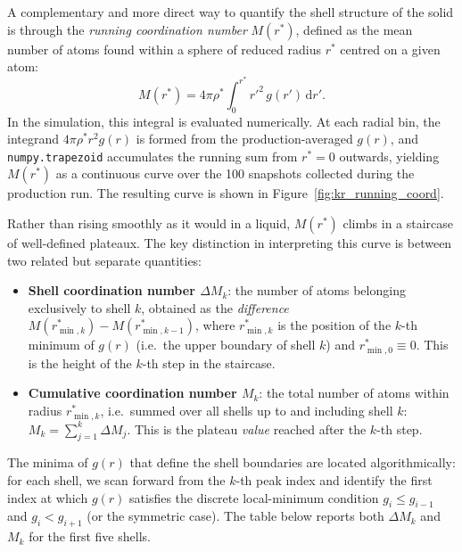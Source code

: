 A complementary and more direct way to quantify the shell structure of the solid is through the \emph{running coordination number} $M(r^*)$, defined as the mean number of atoms found within a sphere of reduced radius $r^*$ centred on a given atom:
\begin{equation}
    M(r^*) = 4\pi\rho^* \int_{0}^{r^*} r'^{2}\, g(r')\, \mathrm{d}r'.
    \label{eq:running_coord}
\end{equation}
In the simulation, this integral is evaluated numerically. At each radial bin, the integrand $4\pi\rho^* r^2 g(r)$ is formed from the production-averaged $g(r)$, and \texttt{numpy.trapezoid} accumulates the running sum from $r^* = 0$ outwards, yielding $M(r^*)$ as a continuous curve over the 100 snapshots collected during the production run. The resulting curve is shown in Figure~\ref{fig:kr_running_coord}.

Rather than rising smoothly as it would in a liquid, $M(r^*)$ climbs in a staircase of well-defined plateaux. The key distinction in interpreting this curve is between two related but separate quantities:
\begin{itemize}
    \item \textbf{Shell coordination number $\Delta M_k$}: the number of atoms belonging exclusively to shell $k$, obtained as the \emph{difference} $M(r^*_{\min,k}) - M(r^*_{\min,k-1})$, where $r^*_{\min,k}$ is the position of the $k$-th minimum of $g(r)$ (i.e.\ the upper boundary of shell $k$) and $r^*_{\min,0} \equiv 0$. This is the height of the $k$-th step in the staircase.
    \item \textbf{Cumulative coordination number $M_k$}: the total number of atoms within radius $r^*_{\min,k}$, i.e.\ summed over all shells up to and including shell $k$: $M_k = \sum_{j=1}^{k} \Delta M_j$. This is the plateau \emph{value} reached after the $k$-th step.
\end{itemize}
The minima of $g(r)$ that define the shell boundaries are located algorithmically: for each shell, we scan forward from the $k$-th peak index and identify the first index at which $g(r)$ satisfies the discrete local-minimum condition $g_i \leq g_{i-1}$ and $g_i < g_{i+1}$ (or the symmetric case). The table below reports both $\Delta M_k$ and $M_k$ for the first five shells.


